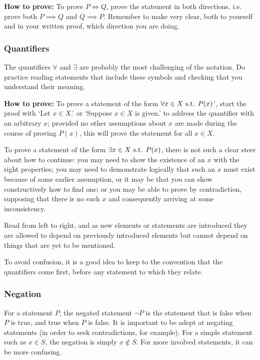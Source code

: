 \textbf{How to prove:} To prove $P \iff Q$, prove the statement in both directions, i.e. prove both $P \implies Q$ and $Q \implies P$. Remember to make very clear, both to yourself and in your written proof, which direction you are doing.

\subsubsection{Quantifiers}
The quantifiers $\forall$ and $\exists$ are probably the most challenging of the notation. Do practice reading statements that include these symbols and checking that you understand their meaning.

\textbf{How to prove:} To prove a statement of the form $\forall x \in X \text{ s.t. } P(x)$’, start the proof with ‘Let $x \in X$.’ or ‘Suppose $x \in X$ is given.’ to address the quantifier with an arbitrary $x$; provided no other assumptions about $x$ are made during the course of proving $P(x)$, this will prove the statement for all $x \in X$. 

To prove a statement of the form $\exists x \in X \text{ s.t. } P(x)$, there is not such a clear steer about how to continue: you may need to show the existence of an $x$ with the right properties; you may need to demonstrate logically that such an $x$ must exist because of some earlier assumption, or it may be that you can show constructively how to find one; or you may be able to prove by contradiction, supposing that there is no such $x$ and consequently arriving at some inconsistency.

\begin{remark}
Read from left to right, and as new elements or statements are introduced they are allowed to depend on previously introduced elements but cannot depend on things that are yet to be mentioned.
\end{remark}

\begin{remark}
To avoid confusion, it is a good idea to keep to the convention that the quantifiers come first, before any statement to which they relate.
\end{remark}

\subsubsection{Negation}
For a statement $P$, the negated statement $\lnot P$ is the statement that is false when $P$ is true, and true when $P$ is false. It is important to be adept at negating statements (in order to seek contradictions, for example). For a simple statement such as $x \in S$, the negation is simply $x \notin S$. For more involved statements, it can be more confusing.

